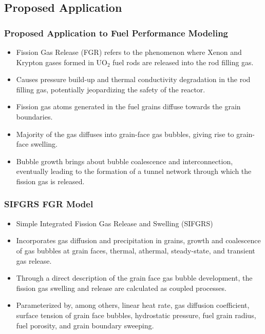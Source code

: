 \documentclass{beamer}
\begin{document}
\subsection{Proposed Application}
\begin{frame}
\frametitle{Proposed Application to Fuel Performance Modeling}

\begin{itemize}
  \item Fission Gas Release (FGR) refers to the phenomenon where Xenon and Krypton gases formed in UO$_2$ fuel rods are released into the rod filling gas.
  \item Causes pressure build-up and thermal conductivity degradation in the rod filling gas, potentially jeopardizing the safety of the reactor.
  \item Fission gas atoms generated in the fuel grains diffuse towards the grain boundaries. 
  \item Majority of the gas diffuses into grain-face gas bubbles, giving rise to grain-face swelling.
  \item Bubble growth brings about bubble coalescence and interconnection, eventually leading to the formation of a tunnel network through which the fission gas is released.       
\end{itemize}

\end{frame}   
\begin{frame}
\frametitle{SIFGRS FGR Model}

\begin{itemize}
  \item Simple Integrated Fission Gas Release and Swelling (SIFGRS)
  \item Incorporates gas diffusion and precipitation in grains, growth and coalescence of gas bubbles at grain faces, thermal, athermal, steady-state, and transient gas release. 
  \item Through a direct description of the grain face gas bubble development, the fission gas swelling and release are calculated as coupled processes.
  \item Parameterized by, among others, linear heat rate, gas diffusion coefficient, surface tension of grain face bubbles, hydrostatic pressure, fuel grain radius, fuel porosity, and grain boundary sweeping. 
\end{itemize}

\end{frame}
\end{document}
